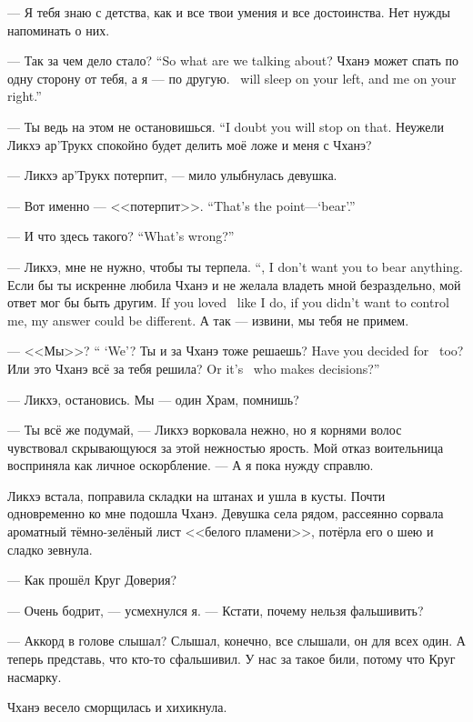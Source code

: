 --- Я тебя знаю с детства, как и все твои умения и все достоинства.
Нет нужды напоминать о них.

{--- Так за чем дело стало?}
{``So what are we talking about?}
{Чханэ может спать по одну сторону от тебя, а я --- по другую.}
{\Chhanei\ will sleep on your left, and me on your right.''}

{--- Ты ведь на этом не остановишься.}
{``I doubt you will stop on that.}
Неужели Ликхэ ар'Трукх спокойно будет делить моё ложе и меня с Чханэ?

--- Ликхэ ар'Трукх потерпит, --- мило улыбнулась девушка.

{--- Вот именно --- <<потерпит>>.}
{``That's the point---`bear'.''}

{--- И что здесь такого?}
{``What's wrong?''}

{--- Ликхэ, мне не нужно, чтобы ты терпела.}
{``\Likchoe, I don't want you to bear anything.}
{Если бы ты искренне любила Чханэ и не желала владеть мной безраздельно, мой ответ мог бы быть другим.}
{If you loved \Chhanei\ like I do, if you didn't want to control me, my answer could be different.}
А так --- извини, мы тебя не примем.

{--- <<Мы>>?}
{`` `We'?}
{Ты и за Чханэ тоже решаешь?}
{Have you decided for \Chhanei\ too?}
{Или это Чханэ всё за тебя решила?}
{Or it's \Chhanei\ who makes decisions?''}

--- Ликхэ, остановись.
Мы --- один Храм, помнишь?

--- Ты всё же подумай, --- Ликхэ ворковала нежно, но я корнями волос чувствовал скрывающуюся за этой нежностью ярость.
Мой отказ воительница восприняла как личное оскорбление.
--- А я пока нужду справлю.

Ликхэ встала, поправила складки на штанах и ушла в кусты.
Почти одновременно ко мне подошла Чханэ.
Девушка села рядом, рассеянно сорвала ароматный тёмно-зелёный лист <<белого пламени>>, потёрла его о шею и сладко зевнула.

--- Как прошёл Круг Доверия?

--- Очень бодрит, --- усмехнулся я.
--- Кстати, почему нельзя фальшивить?

--- Аккорд в голове слышал?
Слышал, конечно, все слышали, он для всех один.
А теперь представь, что кто-то сфальшивил.
У нас за такое били, потому что Круг насмарку.

Чханэ весело сморщилась и хихикнула.

